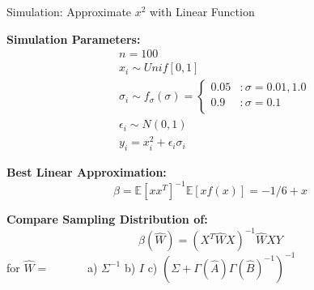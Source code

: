 \documentclass[12pt]{beamer}
\newcommand{\E}{\mathbb{E}}
\begin{document}




\begin{frame}{Simulation: Approximate $x^2$ with Linear Function}

  \textbf{Simulation Parameters:}
  \begin{align*}
        &n=100\\
        &x_i \sim Unif[0,1]\\
        &\sigma_i \sim f_{\sigma}(\sigma) = \left\{
          \begin{array}{lr}
            0.05 \! &:  \! \sigma=0.01,1.0\\ 
            0.9  \! &: \! \sigma=0.1\\
          \end{array} \right.\\
        &\epsilon_i \sim N(0,1)\\
        &y_i = x_i^2 + \epsilon_i\sigma_i
  \end{align*}

  \textbf{Best Linear Approximation:}
  \begin{equation*}
      \beta = \E[xx^T]^{-1}\E[xf(x)] = -1/6 + x
  \end{equation*}

  \textbf{Compare Sampling Distribution of:}
  \begin{equation*}
    \widehat{\beta}(\widehat{W}) = (X^T\widehat{W}X)^{-1}\widehat{W}XY
  \end{equation*}
  for  $\widehat{W}= \, \, \, \, \, \, \, \, \, \, \, \, \, \, \, \, \, \,$  a)  $\Sigma^{-1}$ \hfill b)   $I$  \hfill c)   $(\Sigma + \Gamma(\widehat{A})\Gamma(\widehat{B})^{-1})^{-1}$
  
  
\end{frame}
\end{document}
